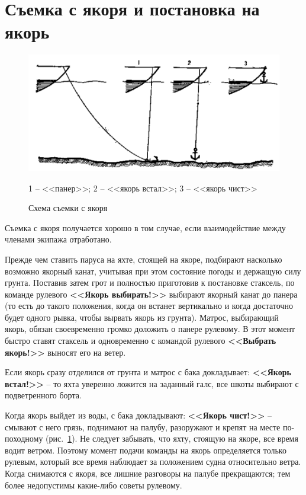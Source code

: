 \documentclass[a4paper, 12pt, twoside, final]{scrbook}
\begin{document}
\section{Съемка с якоря и постановка на якорь}

\begin{figure}[htbp]
   \centering
   \includegraphics{127_S'emka_s_jakorja} %
   \caption{Схема съемки с якоря}
   \label{fig:127}
   \centering\small
   1 \--- <<панер>>; 2 \--- <<якорь встал>>; 3 \--- <<якорь чист>>
\end{figure}

Съемка с якоря получается хорошо в том случае, если взаимодействие между членами экипажа отработано.

Прежде чем ставить паруса на яхте, стоящей на якоре, подбирают насколько возможно якорный канат, учитывая при этом состояние погоды и держащую силу грунта. Поставив затем грот и полностью приготовив к постановке стаксель, по команде рулевого \textbf{<<Якорь выбирать!>>} выбирают якорный канат до панера (то есть до такого положения, когда он встанет вертикально и когда достаточно будет одного рывка, чтобы вырвать якорь из грунта). Матрос, выбирающий якорь, обязан своевременно громко доложить о панере рулевому. В этот момент быстро ставят стаксель и одновременно с командой рулевого \textbf{<<Выбрать якорь!>>} выносят его на ветер.

Если якорь сразу отделился от грунта и матрос с бака докладывает: \textbf{<<Якорь встал!>>} \--- то яхта уверенно ложится на заданный галс, все шкоты выбирают с подветренного борта. 

Когда якорь выйдет из воды, с бака докладывают:\textbf{ <<Якорь чист!>>} \--- смывают с него грязь, поднимают на палубу, разоружают и крепят на месте по-походному (рис.~\ref{fig:127}). Не следует забывать, что яхту, стоящую на якоре, все время водит ветром. Поэтому момент подачи команды на якорь определяется только рулевым, который все время наблюдает за положением судна относительно ветра. Когда снимаются с якоря, все лишние разговоры на палубе прекращаются; тем более недопустимы какие-либо советы рулевому.
\end{document}

